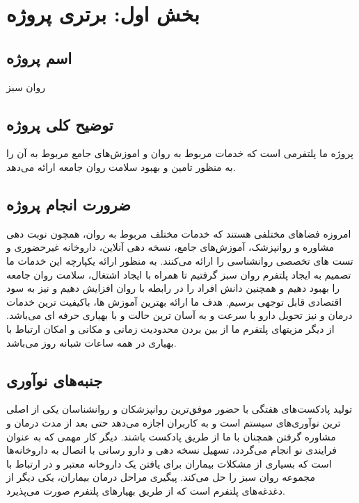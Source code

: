 \documentclass[a4paper]{article}
\begin{document}
	

		\section{بخش اول: برتری پروژه}
		\subsection{اسم پروژه}
 روان سبز
		\subsection{توضیح کلی پروژه}
		پروژه ما پلتفرمی است که خدمات مربوط به روان و اموزش‌های جامع مربوط به آن را به منظور تامین و بهبود سلامت روان جامعه ارائه می‌دهد.
		
		\subsection{ضرورت انجام پروژه}
		امروزه فضاهای مختلفی هستند که خدمات مختلف مربوط به روان، همچون نوبت دهی مشاوره و روانپزشک، آموزش‌های جامع، نسخه دهی آنلاین، داروخانه غیرحضوری و تست های تخصصی روانشناسی را ارائه می‌کنند.
		به منظور ارائه یکپارچه این خدمات ما تصمیم به ایجاد پلتفرم روان سبز گرفتیم تا همراه با ایجاد اشتغال، سلامت روان جامعه را بهبود دهیم و همچنین دانش افراد را در رابطه با روان افزایش دهیم و نیز به سود اقتصادی قابل توجهی برسیم. هدف ما ارائه بهترین آموزش ها، باکیفیت ترین خدمات درمان و نیز تحویل دارو با سرعت و به آسان ترین حالت و با بهیاری حرفه ای می‌باشد.
		از دیگر مزیتهای پلتفرم ما از بین بردن محدودیت زمانی و مکانی و امکان ارتباط با بهیاری در همه ساعات شبانه روز می‌باشد.
		
		\subsection{جنبه‌های نوآوری}
				تولید پادکست‌های هفتگی با حضور موفق‌ترین روانپزشکان و روانشناسان یکی از اصلی ترین نوآوری‌های سیستم است و به کاربران اجازه می‌دهد حتی بعد از مدت درمان و مشاوره گرفتن همچنان با ما از طریق پادکست باشند.
				دیگر کار مهمی که به عنوان فرایندی نو انجام می‌گردد، تسهیل نسخه دهی و دارو رسانی با اتصال به داروخانه‌ها است که بسیاری از مشکلات بیماران برای یافتن یک داروخانه معتبر و در ارتباط با مجموعه روان سبز را حل می‌کند.
				پیگیری مراحل درمان بیماران، یکی دیگر از دغدغه‌های پلتفرم است که از طریق بهیار‌های پلتفرم صورت می‌پذیرد.
				
\end{document}
